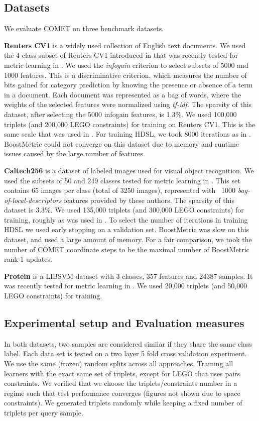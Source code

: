 \documentclass{article} %
\begin{document}
\subsection{Datasets}
We evaluate COMET on three benchmark datasets.

\textbf{Reuters CV1} is a widely used collection of English text documents. We used the 4-class subset of Reuters CV1 introduced in \cite{CaiRCV14} that was recently tested for metric learning in \cite{hdsl}. We used the \textit{infogain} criterion \cite{infogain} to select subsets of 5000 and 1000 features. This is a discriminative criterion, which measures the number of bits gained for category prediction by knowing the presence or absence of a term in a document. Each document was represented as a bag of words, where the weights of the selected features were normalized using \textit{tf-idf}. The sparsity of this dataset, after selecting the 5000 infogain features, is 1.3\%. We used 100,000 triplets (and 200,000 LEGO constraints) for training on Reuters CV1. This is the same scale that was used in \cite{hdsl}. For training HDSL, we took 8000 iterations as in \cite{hdsl}. BoostMetric could not converge on this dataset due to memory and runtime issues caused by the large number of features.

\textbf{Caltech256} is a dataset of labeled images used for visual object recognition. We used the subsets of 50 and 249 classes tested for metric learning in \cite{OASIS}. This set contains 65 images per class (total of 3250 images), represented with ~1000 \textit{bag-of-local-descriptors} features provided by these authors. The sparsity of this dataset is 3.3\%. We used 135,000 triplets (and 300,000 LEGO constraints) for training, roughly as was used in \cite{OASIS}. To select the number of iterations in training HDSL we used early stopping on a validation set. BoostMetric was slow on this dataset, and used a large amount of memory. For a fair comparison, we took the number of COMET coordinate steps to be the maximal number of BoostMetric rank-1 updates.

\textbf{Protein} is a LIBSVM \cite{libsvm} dataset with 3 classes, 357 features and 24387 samples. It was recently tested for metric learning in \cite{qian}. We used 20,000 triplets (and 50,000 LEGO constraints) for training.

\subsection{Experimental setup and Evaluation measures}
In both datasets, two samples are considered similar if they share the same class label. Each data set is tested on a two layer 5 fold cross validation experiment. We use the same (frozen) random splits across all approaches. Training all learners with the exact same set of triplets, except for LEGO that uses pairs constraints. We verified that we choose the triplets/constraints number in a regime such that test performance converges (figures not shown due to space constraints). We generated triplets randomly while keeping a fixed number of triplets per query sample.
\end{document}
